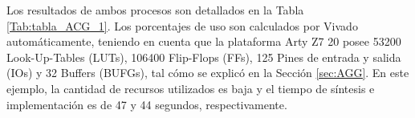 	Los resultados de ambos procesos son detallados en la Tabla \ref{Tab:tabla_ACG_1}. Los porcentajes de uso son calculados por Vivado automáticamente, teniendo en cuenta que la plataforma Arty Z7 20 posee 53200 Look-Up-Tables (LUTs), 106400 Flip-Flops (FFs), 125 Pines de entrada y salida (IOs) y 32 Buffers (BUFGs), tal cómo se explicó en la Sección \ref{sec:AGG}. En este ejemplo, la cantidad de recursos utilizados es baja y el tiempo de síntesis e implementación es de 47 y 44 segundos, respectivamente.
	
	\begin{table}[H]
		{
			\caption{Síntesis e implementación del ejemplo 1 generado por el ACG.}
			\label{Tab:tabla_ACG_1}
			\centering
			\begin{center}
			\end{center}
		}    
	\end{table}
	
	
	